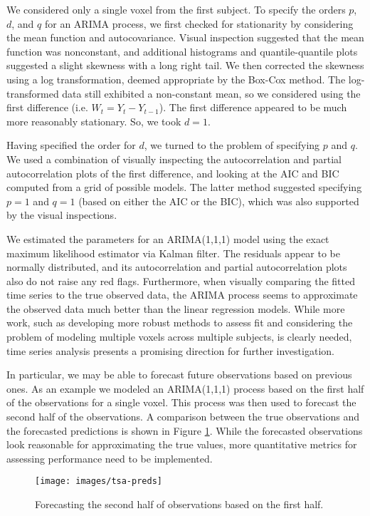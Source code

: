 \par \indent We considered only a single voxel from the first subject. To specify the orders $p$, $d$, and $q$ for an ARIMA process, we first checked for stationarity by considering the mean function and autocovariance. Visual inspection suggested that the mean function was nonconstant, and additional histograms and quantile-quantile plots suggested a slight skewness with a long right tail. We then corrected the skewness using a log transformation, deemed appropriate by the Box-Cox method. The log-transformed data still exhibited a non-constant mean, so we considered using the first difference (i.e. $W_t = Y_t - Y_{t-1}$). The first difference appeared to be much more reasonably stationary. So, we took $d=1$. 
\par Having specified the order for $d$, we turned to the problem of specifying $p$ and $q$. We used a combination of visually inspecting the autocorrelation and partial autocorrelation plots of the first difference, and looking at the AIC and BIC computed from a grid of possible models. The latter method suggested specifying $p=1$ and $q=1$ (based on either the AIC or the BIC), which was also supported by the visual inspections. 
\par We estimated the parameters for an ARIMA(1,1,1) model using the exact maximum likelihood estimator via Kalman filter. The residuals appear to be normally distributed, and its autocorrelation and partial autocorrelation plots also do not raise any red flags. Furthermore, when visually comparing the fitted time series to the true observed data, the ARIMA process seems to approximate the observed data much better than the linear regression models. While more work, such as developing more robust methods to assess fit and considering the problem of modeling multiple voxels across multiple subjects, is clearly needed, time series analysis presents a promising direction for further investigation. 
\par In particular, we may be able to forecast future observations based on previous ones. As an example we modeled an ARIMA(1,1,1) process based on the first half of the observations for a single voxel. This process was then used to forecast the second half of the observations. A comparison between the true observations and the forecasted predictions is shown in Figure \ref{fig:tsa-preds}. While the forecasted observations look reasonable for approximating the true values, more quantitative metrics for assessing performance need to be implemented. 
\begin{figure}[ht]
\centering
\texttt{[image: images/tsa-preds]}
\label{fig:tsa-preds}
\caption{Forecasting the second half of observations based on the first half.}
\end{figure}

